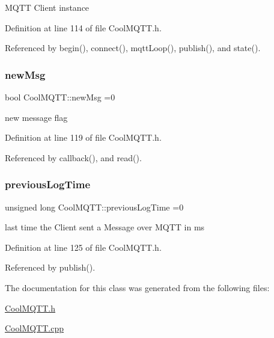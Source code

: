 M\+Q\+TT Client instance 

Definition at line 114 of file Cool\+M\+Q\+T\+T.\+h.



Referenced by begin(), connect(), mqtt\+Loop(), publish(), and state().

\mbox{\label{class_cool_m_q_t_t_a3240388137b885775aadf38e96b24c6b}} 
\subsubsection{\texorpdfstring{new\+Msg}{newMsg}}
{\footnotesize\ttfamily bool Cool\+M\+Q\+T\+T\+::new\+Msg =0\hspace{0.3cm}{\ttfamily [private]}}

new message flag 

Definition at line 119 of file Cool\+M\+Q\+T\+T.\+h.



Referenced by callback(), and read().

\mbox{\label{class_cool_m_q_t_t_a3db37ef9ed3b05b2a8d44edba0e7d3cc}} 
\subsubsection{\texorpdfstring{previous\+Log\+Time}{previousLogTime}}
{\footnotesize\ttfamily unsigned long Cool\+M\+Q\+T\+T\+::previous\+Log\+Time =0\hspace{0.3cm}{\ttfamily [private]}}

last time the Client sent a Message over M\+Q\+TT in ms 

Definition at line 125 of file Cool\+M\+Q\+T\+T.\+h.



Referenced by publish().



The documentation for this class was generated from the following files\+:\begin{DoxyCompactItemize}
\item 
\hyperlink{_cool_m_q_t_t_8h}{Cool\+M\+Q\+T\+T.\+h}\item 
\hyperlink{_cool_m_q_t_t_8cpp}{Cool\+M\+Q\+T\+T.\+cpp}\end{DoxyCompactItemize}
